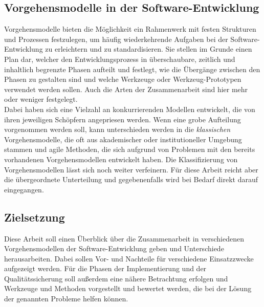 \subsection{Vorgehensmodelle in der Software-Entwicklung}
\label{sec:einleitung:vorgehensmodelle}
Vorgehensmodelle bieten die Möglichkeit ein Rahmenwerk mit festen Strukturen und Prozessen festzulegen, um häufig wiederkehrende Aufgaben bei der Software-Entwicklung zu erleichtern und zu standardisieren. Sie stellen im Grunde einen Plan dar, welcher den Entwicklungsprozess in überschaubare, zeitlich und inhaltlich begrenzte Phasen aufteilt und festlegt, wie die Übergänge zwischen den Phasen zu gestalten sind und welche Werkzeuge oder Werkzeug-Prototypen verwendet werden sollen. Auch die Arten der Zusammenarbeit sind hier mehr oder weniger festgelegt.
\\
Dabei haben sich eine Vielzahl an konkurrierenden Modellen entwickelt, die von ihren jeweiligen Schöpfern angepriesen werden.
Wenn eine grobe Aufteilung vorgenommen werden soll, kann unterschieden werden in die \emph{klassischen} Vorgehensmodelle, die oft aus akademischer oder institutioneller Umgebung stammen und agile Methoden, die sich aufgrund von Problemen mit den bereits vorhandenen Vorgehensmodellen entwickelt haben. Die Klassifizierung von Vorgehensmodellen lässt sich noch weiter verfeinern. Für diese Arbeit reicht aber die übergeordnete Unterteilung und gegebenenfalls wird bei Bedarf direkt darauf eingegangen.

\subsection{Zielsetzung}
\label{sec:einleitung:zielsetzung}

Diese Arbeit soll einen Überblick über die Zusammenarbeit in verschiedenen Vorgehensmodellen der Software-Entwicklung geben und Unterschiede herausarbeiten. Dabei sollen Vor- und Nachteile für verschiedene Einsatzzwecke aufgezeigt werden. 
Für die Phasen der Implementierung und der Qualitätssicherung soll außerdem eine nähere Betrachtung erfolgen und Werkzeuge und Methoden vorgestellt und bewertet werden, die bei der Lösung der genannten Probleme helfen können.
